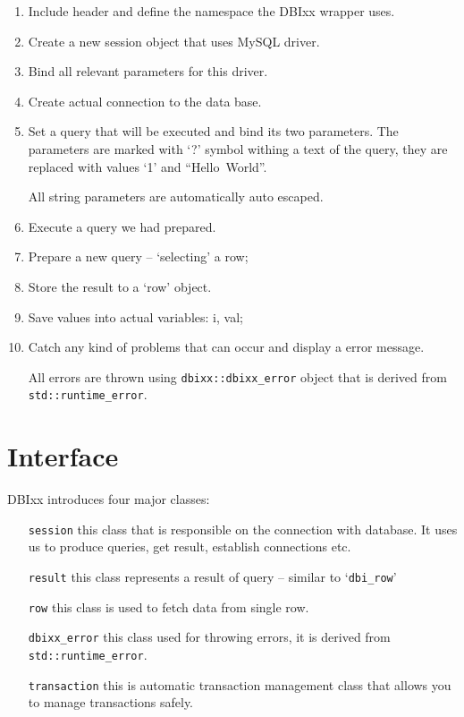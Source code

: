 \documentclass[11pt]{article}
\newcommand{\tw}[1]{\texttt{#1}}
\begin{document}
\begin{enumerate}
\item Include header and define the namespace the DBIxx wrapper uses.
\item Create a new session object that uses MySQL driver.
\item Bind all relevant parameters for this driver.
\item Create actual connection to the data base.
\item Set a query that will be executed and bind its two parameters. The parameters are marked with `?' symbol withing a text of the query, they are replaced with values `1' and ``Hello~World''.

All string parameters are automatically auto escaped.
\item Execute a query we had prepared.
\item Prepare a new query -- `selecting' a row;
\item Store the result to a `row' object.
\item Save values into actual variables: i, val;
\item Catch any kind of problems that can occur and display a error message.

All errors are thrown using \verb+dbixx::dbixx_error+ object that is derived from \verb+std::runtime_error+.
\end{enumerate}

\section{Interface}

DBIxx introduces four major classes:
\begin{itemize}
\item[\tw{session}] this class that is responsible on the connection with database. It uses us to produce queries, get result, establish connections etc.
\item[\tw{result}] this class represents a result of query -- similar to `\verb+dbi_row+'
\item[\tw{row}] this class is used to fetch data from single row.
\item[\tw{dbixx\_error}] this class used for throwing errors, it is derived from \verb+std::runtime_error+.
\item[\tw{transaction}] this is automatic transaction management class that allows you to manage transactions safely.
\end{itemize}
\end{document}
